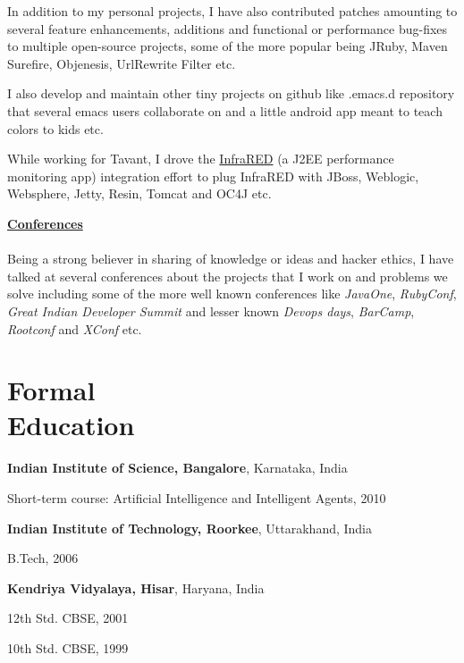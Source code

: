 \documentclass[margin,line]{res}
\newenvironment{list1}{
  \begin{list}{\ding{113}}{%
      \setlength{\itemsep}{0in}
      \setlength{\parsep}{0in} \setlength{\parskip}{0in}
      \setlength{\topsep}{0in} \setlength{\partopsep}{0in} 
      \setlength{\leftmargin}{0.17in}}}{\end{list}}
\begin{document}
\begin{resume}
        In addition to my personal projects, I have also contributed patches amounting to several feature enhancements, additions and functional or performance bug-fixes to multiple open-source projects, some of the more popular being JRuby, Maven Surefire, Objenesis, UrlRewrite Filter etc.

        I also develop and maintain other tiny projects on github like .emacs.d repository that several emacs users collaborate on and a little android app meant to teach colors to kids etc.

        While working for Tavant, I drove the \href{http://sourceforge.net/projects/infrared}{InfraRED} (a J2EE performance monitoring app) integration effort to plug InfraRED with JBoss, Weblogic, Websphere, Jetty, Resin, Tomcat and OC4J etc.

        {\underline {\bf Conferences}}\\
        \vspace{-.2cm}\\
        Being a strong believer in sharing of knowledge or ideas and hacker ethics, I have talked at several conferences about the projects that I work on and problems we solve including some of the more well known conferences like {\em JavaOne}, {\em RubyConf}, {\em Great Indian Developer Summit} and lesser known {\em Devops days}, {\em BarCamp}, {\em Rootconf} and {\em XConf} etc.\\

\section{\sc Formal \\Education}

{\bf Indian Institute of Science, Bangalore}, Karnataka, India\\
\vspace{-.3cm}
\begin{list1}
\item[] Short-term course: Artificial Intelligence and Intelligent Agents, 2010
\end{list1}

{\bf Indian Institute of Technology, Roorkee}, Uttarakhand, India\\
\vspace{-.3cm}
\begin{list1}
\item[] B.Tech, 2006
\end{list1}

{\bf Kendriya Vidyalaya, Hisar}, Haryana, India\\
\vspace{-.3cm}
\begin{list1}
\item[] 12th Std. CBSE, 2001
\item[] 10th Std. CBSE, 1999
\end{list1}


\end{resume}
\end{document}
